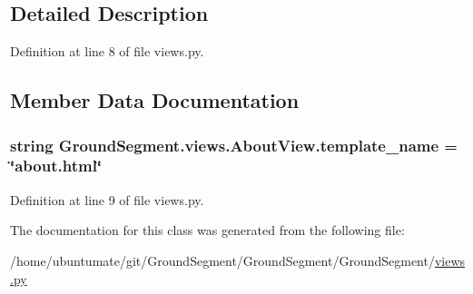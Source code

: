 \subsection{Detailed Description}


Definition at line 8 of file views.\+py.



\subsection{Member Data Documentation}
\hypertarget{class_ground_segment_1_1views_1_1_about_view_afcb2c31fc5a893eaaae12cbf7620b96d}{}
\subsubsection[{template\+\_\+name}]{\setlength{\rightskip}{0pt plus 5cm}string Ground\+Segment.\+views.\+About\+View.\+template\+\_\+name = \char`\"{}about.\+html\char`\"{}\hspace{0.3cm}{\ttfamily [static]}}\label{class_ground_segment_1_1views_1_1_about_view_afcb2c31fc5a893eaaae12cbf7620b96d}


Definition at line 9 of file views.\+py.



The documentation for this class was generated from the following file\+:\begin{DoxyCompactItemize}
\item 
/home/ubuntumate/git/\+Ground\+Segment/\+Ground\+Segment/\+Ground\+Segment/\hyperlink{views_8py}{views.\+py}\end{DoxyCompactItemize}
